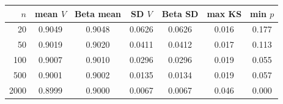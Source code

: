 \begin{tabular}{rcccccc}\toprule
$n$ & mean $V$ & Beta mean & SD $V$ & Beta SD & max KS & min $p$\\\midrule
20 & 0.9049 & 0.9048 & 0.0626 & 0.0626 & 0.016 & 0.177\\
50 & 0.9019 & 0.9020 & 0.0411 & 0.0412 & 0.017 & 0.113\\
100 & 0.9007 & 0.9010 & 0.0296 & 0.0296 & 0.019 & 0.055\\
500 & 0.9001 & 0.9002 & 0.0135 & 0.0134 & 0.019 & 0.057\\
2000 & 0.8999 & 0.9000 & 0.0067 & 0.0067 & 0.046 & 0.000\\
\bottomrule\end{tabular}
